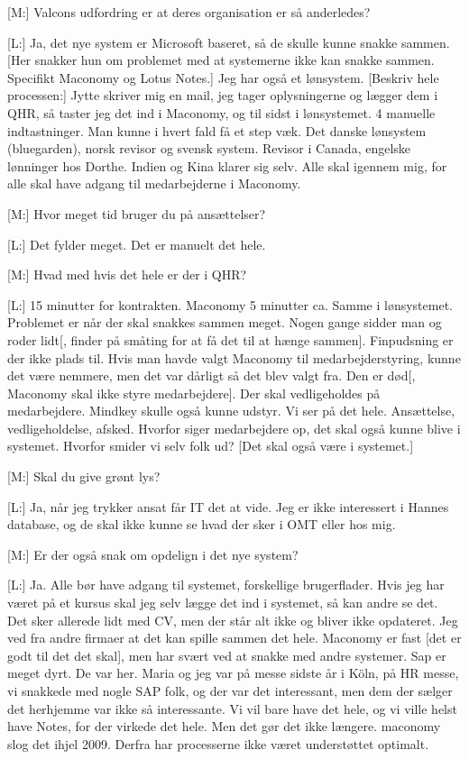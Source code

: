 [M:] Valcons udfordring er at deres organisation er så anderledes?

[L:] Ja, det nye system er Microsoft baseret, så de skulle kunne snakke sammen. [Her snakker hun om problemet med at systemerne ikke kan snakke sammen. Specifikt Maconomy og Lotus Notes.]
Jeg har også et lønsystem.
[Beskriv hele processen:] Jytte skriver mig en mail, jeg tager oplysningerne og lægger dem i QHR, så taster jeg det ind i Maconomy, og til sidst i lønsystemet. 4 manuelle indtastninger. Man kunne i hvert fald få et step væk. Det danske lønsystem (bluegarden), norsk revisor og svensk system. Revisor i Canada, engelske lønninger hos Dorthe. Indien og Kina klarer sig selv. Alle skal igennem mig, for alle skal have adgang til medarbejderne i Maconomy.

[M:] Hvor meget tid bruger du på ansættelser?

[L:] Det fylder meget. Det er manuelt det hele.

[M:] Hvad med hvis det hele er der i QHR? 

[L:] 15 minutter for kontrakten. Maconomy 5 minutter ca. Samme i lønsystemet. Problemet er når der skal snakkes sammen meget. Nogen gange sidder man og roder lidt[, finder på småting for at få det til at hænge sammen]. Finpudsning er der ikke plads til. Hvis man havde valgt Maconomy til medarbejderstyring, kunne det være nemmere, men det var dårligt så det blev valgt fra. Den er død[, Maconomy skal ikke styre medarbejdere]. Der skal vedligeholdes på medarbejdere. Mindkey skulle også kunne udstyr. Vi ser på det hele. Ansættelse, vedligeholdelse, afsked. Hvorfor siger medarbejdere op, det skal også kunne blive i systemet. Hvorfor smider vi selv folk ud? [Det skal også være i systemet.]

[M:] Skal du give grønt lys?

[L:] Ja, når jeg trykker ansat får IT det at vide. Jeg er ikke interessert i Hannes database, og de skal ikke kunne se hvad der sker i OMT eller hos mig.

[M:] Er der også snak om opdelign i det nye system?

[L:] Ja.
Alle bør have adgang til systemet, forskellige brugerflader. Hvis jeg har været på et kursus skal jeg selv lægge det ind i systemet, så kan andre se det. Det sker allerede lidt med CV, men der står alt ikke og bliver ikke opdateret.
Jeg ved fra andre firmaer at det kan spille sammen det hele.
Maconomy er fast [det er godt til det det skal], men har svært ved at snakke med andre systemer. Sap er meget dyrt. De var her.
Maria og jeg var på messe sidste år i Köln, på HR messe, vi snakkede med nogle SAP folk, og der var det interessant, men dem der sælger det herhjemme var ikke så interessante. Vi vil bare have det hele, og vi ville helst have Notes, for der virkede det hele. Men det gør det ikke længere. maconomy slog det ihjel 2009. Derfra har processerne ikke været understøttet optimalt. 


